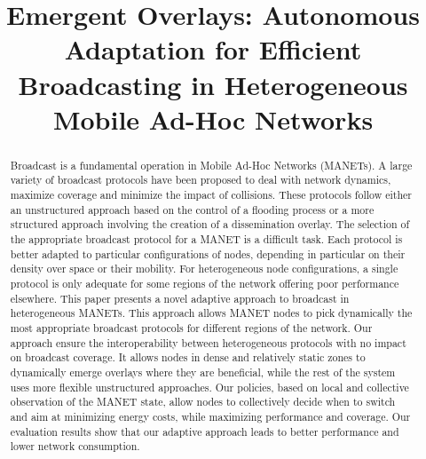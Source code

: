 \documentclass[10pt, conference, letterpaper]{IEEEtran}
\begin{document}
\title{Emergent Overlays: Autonomous Adaptation for Efficient Broadcasting in Heterogeneous Mobile Ad-Hoc Networks}


\author{\IEEEauthorblockN{}
\IEEEauthorblockA{}
}

\maketitle

\begin{abstract}
Broadcast is a fundamental operation in Mobile Ad-Hoc Networks (MANETs).
A large variety of broadcast protocols have been proposed to deal with network dynamics, maximize coverage and minimize the impact of collisions.
These protocols follow either an unstructured approach based on the control of a flooding process or a more structured approach involving the creation of a dissemination overlay.
The selection of the appropriate broadcast protocol for a MANET is a difficult task.
Each protocol is better adapted to particular configurations of nodes, depending in particular on their density over space or their mobility.
For heterogeneous node configurations, a single protocol is only adequate for some regions of the network offering poor performance elsewhere.
This paper presents a novel adaptive approach to broadcast in heterogeneous MANETs.
This approach allows MANET nodes to pick dynamically the most appropriate broadcast protocols for different regions of the network.
Our approach ensure the interoperability between heterogeneous protocols with no impact on broadcast coverage.
It allows nodes in dense and relatively static zones to dynamically emerge overlays where they are beneficial, while the rest of the system uses more flexible unstructured approaches.
Our policies, based on local and collective observation of the MANET state, allow nodes to collectively decide when to switch and aim at minimizing energy costs, while maximizing performance and coverage.
%
%
Our evaluation results show that our adaptive approach leads to better performance and lower network consumption.
\end{abstract}

\IEEEpeerreviewmaketitle











\appendix

\end{document}
